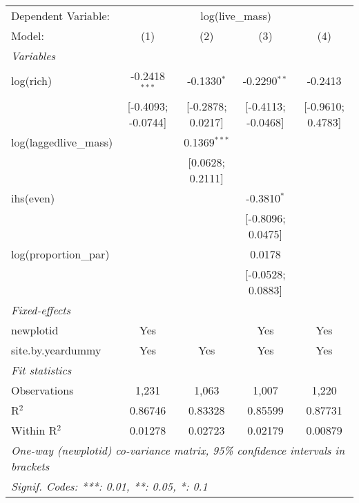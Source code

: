 \begin{tabular}{lcccc}
\tabularnewline\midrule\midrule
Dependent Variable:&\multicolumn{4}{c}{log(live\_mass)}\\
Model:&(1) & (2) & (3) & (4)\\
\midrule \emph{Variables}&   &   &   &  \\
log(rich)&-0.2418$^{***}$ & -0.1330$^{*}$ & -0.2290$^{**}$ & -0.2413\\
  &[-0.4093; -0.0744] & [-0.2878; 0.0217] & [-0.4113; -0.0468] & [-0.9610; 0.4783]\\
log(laggedlive\_mass)&   & 0.1369$^{***}$ &    &   \\
  &   & [0.0628; 0.2111] &    &   \\
ihs(even)&   &    & -0.3810$^{*}$ &   \\
  &   &    & [-0.8096; 0.0475] &   \\
log(proportion\_par)&   &    & 0.0178 &   \\
  &   &    & [-0.0528; 0.0883] &   \\
\midrule \emph{Fixed-effects}&   &   &   &  \\
newplotid & Yes &  & Yes & Yes\\
site.by.yeardummy & Yes & Yes & Yes & Yes\\
\midrule \emph{Fit statistics}&  & & & \\
Observations & 1,231&1,063&1,007&1,220\\
R$^2$ & 0.86746&0.83328&0.85599&0.87731\\
Within R$^2$ & 0.01278&0.02723&0.02179&0.00879\\
\midrule\midrule\multicolumn{5}{l}{\emph{One-way (newplotid) co-variance matrix, 95\% confidence intervals in brackets}}\\
\multicolumn{5}{l}{\emph{Signif. Codes: ***: 0.01, **: 0.05, *: 0.1}}\\
\end{tabular}


